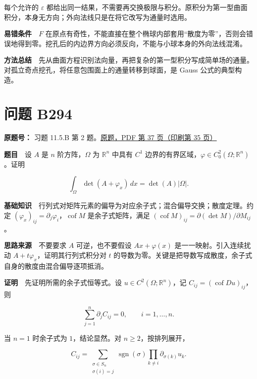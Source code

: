 \documentclass[11pt,a4paper]{article}
\begin{document}
每个允许的 \(\varepsilon\)
都给出同一结果，不需要再交换极限与积分。原积分为第一型曲面积分，本身无方向；外向法线只是在将它改写为通量时选用。

\textbf{易错条件}　\(F\)
在原点有奇性，不能直接在整个椭球内部套用``散度为零''，否则会错误地得到零。挖孔后的内边界方向必须反向，不能与小球本身的外向法线混淆。

\textbf{方法总结}　先从曲面方程识别法向量，再把复杂的第一型积分写成简单场的通量。对孤立奇点挖孔，将任意包围面上的通量转移到球面，是
Gauss 公式的典型构造。

\section{问题 B294}\label{ux95eeux9898-b294}

\textbf{原题号：} 习题 11.5.B 第 2
题。\href{https://zj139.github.io/math-notes/files/problems/楼分析习题-v2.pdf\#page=37}{原题，PDF
第 37 页（印刷第 35 页）}

\textbf{题目}　设 \(A\) 是 \(n\) 阶方阵，\(\Omega\) 为 \(\mathbb R^n\)
中具有 \(C^1\)
边界的有界区域，\(\varphi\in C_0^2(\Omega;\mathbb R^n)\)。证明

\begin{equation}
\int_\Omega\det(A+\varphi_x)\,dx=\det(A)|\Omega|.
\tag{29}
\end{equation}

\textbf{基础知识}　行列式对矩阵元素的偏导为对应余子式；混合偏导交换；散度定理。约定
\((\varphi_x)_{ij}=\partial_j\varphi_i\)，\(\operatorname{cof}M\)
是余子式矩阵，满足
\((\operatorname{cof}M)_{ij}=\partial(\det M)/\partial M_{ij}\)。

\textbf{思路来源}　不要要求 \(A\) 可逆，也不要假设 \(Ax+\varphi(x)\)
是一一映射。引入连续扰动 \(A+t\varphi_x\)，证明其行列式积分对 \(t\)
的导数为零。关键是把导数写成散度，余子式自身的散度由混合偏导逐项抵消。

\textbf{证明}　先证明所需的余子式恒等式。设
\(u\in C^2(\Omega;\mathbb R^n)\)，记
\(C_{ij}=(\operatorname{cof}Du)_{ij}\)，则

\begin{equation}
\sum_{j=1}^n\partial_j C_{ij}=0,
\qquad i=1,\ldots,n.
\tag{30}
\end{equation}

当 \(n=1\) 时余子式为 \(1\)，结论显然。对 \(n\ge2\)，按排列展开，

\begin{equation}
C_{ij}=\sum_{\substack{\sigma\in S_n\\\sigma(i)=j}}
\operatorname{sgn}(\sigma)\prod_{k\ne i}\partial_{\sigma(k)}u_k.
\tag{31}
\end{equation}
\end{document}
